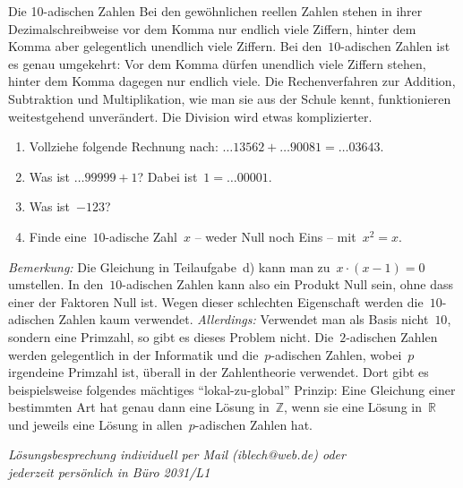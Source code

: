 \documentclass{../zirkelblatt1415}
\begin{document}
\begin{aufgabe}{Die 10-adischen Zahlen}
Bei den gewöhnlichen reellen Zahlen stehen in ihrer Dezimalschreibweise vor dem
Komma nur endlich viele Ziffern, hinter dem Komma aber gelegentlich unendlich
viele Ziffern. Bei den~$10$-adischen Zahlen ist es genau umgekehrt: Vor dem
Komma dürfen unendlich viele Ziffern stehen, hinter dem Komma dagegen nur
endlich viele. Die Rechenverfahren zur Addition, Subtraktion und
Multiplikation, wie man sie aus der Schule kennt, funktionieren weitestgehend
unverändert. Die Division wird etwas komplizierter.
\begin{enumerate}
\item Vollziehe folgende Rechnung nach:
$\ldots 13562 + \ldots 90081 = \ldots 03643$.
\item Was ist $\ldots 99999 + 1$? Dabei ist~$1 = \ldots 00001$.
\item Was ist~$-123$?
\item Finde eine~$10$-adische Zahl~$x$ -- weder Null noch Eins -- mit~$x^2 = x$.
\end{enumerate}
{\scriptsize
\emph{Bemerkung:} Die Gleichung in Teilaufgabe~d) kann man zu~$x \cdot (x-1) =
0$ umstellen. In den~$10$-adischen Zahlen kann also ein Produkt Null sein, ohne
dass einer der Faktoren Null ist. Wegen dieser schlechten Eigenschaft werden
die~$10$-adischen Zahlen kaum verwendet. \emph{Allerdings:} Verwendet man als
Basis nicht~$10$, sondern eine Primzahl, so gibt es dieses Problem nicht.
Die~$2$-adischen Zahlen werden gelegentlich in der Informatik und
die~$p$-adischen Zahlen, wobei~$p$ irgendeine Primzahl ist, überall in der
Zahlentheorie verwendet. Dort gibt es beispielsweise folgendes mächtiges
"`lokal-zu-global"' Prinzip: Eine Gleichung einer bestimmten Art hat genau dann
eine Lösung in~$\mathbb{Z}$, wenn sie eine Lösung in~$\mathbb{R}$ und jeweils
eine Lösung in allen~$p$-adischen Zahlen hat.\par}
\end{aufgabe}

\begin{center}
  \emph{Lösungsbesprechung individuell per Mail (iblech@web.de) oder \\
  jederzeit persönlich in Büro 2031/L1}
\end{center}
\end{document}
